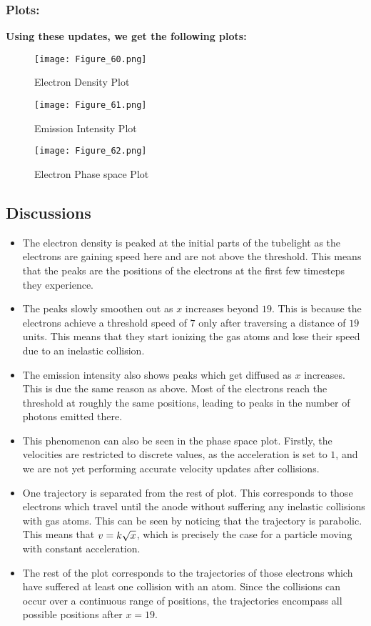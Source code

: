 \documentclass[11pt, a4paper, twoside]{article}
\begin{document}
\subsubsection*{Plots:}
\textbf{Using these updates, we get the following plots:}
\begin{figure}[!tbh]
      \centering
      \texttt{[image: Figure\_60.png]}  
       \caption{Electron Density Plot}
 \end{figure}

\begin{figure}[!tbh]
      \centering
      \texttt{[image: Figure\_61.png]}  
      \caption{Emission Intensity Plot }
 \end{figure}

\begin{figure}[!tbh]
      \centering
      \texttt{[image: Figure\_62.png]}  
      \caption{Electron Phase space Plot}
 \end{figure}
 


\newpage
\subsection*{Discussions}
\begin{itemize}
\item
  The electron density is peaked at the initial parts of the tubelight
  as the electrons are gaining speed here and are not above the
  threshold. This means that the peaks are the positions of the
  electrons at the first few timesteps they experience.
\item
  The peaks slowly smoothen out as \(x\) increases beyond \(19\). This
  is because the electrons achieve a threshold speed of \(7\) only after
  traversing a distance of \(19\) units. This means that they start
  ionizing the gas atoms and lose their speed due to an inelastic
  collision.
\item
  The emission intensity also shows peaks which get diffused as \(x\)
  increases. This is due the same reason as above. Most of the electrons
  reach the threshold at roughly the same positions, leading to peaks in
  the number of photons emitted there.
\item
  This phenomenon can also be seen in the phase space plot. Firstly, the
  velocities are restricted to discrete values, as the acceleration is
  set to \(1\), and we are not yet performing accurate velocity updates
  after collisions.
\item
  One trajectory is separated from the rest of plot. This corresponds to
  those electrons which travel until the anode without suffering any
  inelastic collisions with gas atoms. This can be seen by noticing that
  the trajectory is parabolic. This means that
  \(v \space = k \sqrt{x}\), which is precisely the case for a particle
  moving with constant acceleration.
\item
  The rest of the plot corresponds to the trajectories of those
  electrons which have suffered at least one collision with an atom.
  Since the collisions can occur over a continuous range of positions,
  the trajectories encompass all possible positions after \(x=19\).
\end{itemize}
\end{document}
